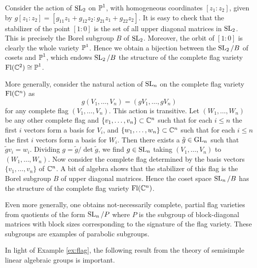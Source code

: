 \begin{example}
    \label{ex:flag}
    Consider the action of $\operatorname{SL}_2$ on $\operatorname{\mathbb{P}}^1$, with homogeneous coordinates $[z_1:z_2]$,
    given by $g[z_1:z_2]=[g_{11}z_1+g_{12}z_2:g_{21}z_1+g_{22}z_2]$. It is easy to check
    that the stabilizer of the point $[1:0]$ is the set of all upper diagonal matrices in
    $\operatorname{SL}_2$. This is precisely the Borel subgroup $B$ of $\operatorname{SL}_2$. Moreover, the orbit of $[1:0]$
    is clearly the whole variety $\operatorname{\mathbb{P}}^1$. Hence we obtain a bijection between the $\operatorname{SL}_2/B$ of
    cosets and $\operatorname{\mathbb{P}}^1$, which endows $\operatorname{SL}_2/B$ the structure of the complete flag variety
    $\operatorname{Fl}(\mathbb{C}^2)\cong\operatorname{\mathbb{P}}^1$.

    More generally, consider the natural action of $\operatorname{SL}_n$ on the complete flag variety
    $\operatorname{Fl}(\mathbb{C}^n)$ as
    \[g(V_1,\ldots, V_n) = (gV_1,\ldots, gV_n)\]
    for any complete flag $(V_1,\ldots,V_n)$. This action is transitive. Let $(W_1,\ldots,W_n)$ be
    any other complete flag and $\{v_1,\ldots,v_n\}\subset \mathbb{C}^n$ such that for each $i\leqslant n$
    the first $i$ vectors form a basis for $V_i$, and $\{w_1,\ldots,w_n\}\subset \mathbb{C}^n$ such that
    for each $i\leqslant n$ the first $i$ vectors form a basis for $W_i$. Then there exists
    a $\tilde g\in\operatorname{GL}_n$ such that $\tilde gv_i=w_i$. Dividing $g=\tilde g/\det \tilde g$,
    we find $g\in\operatorname{SL}_n$ taking $(V_1,\ldots,V_n)$ to $(W_1,\ldots,W_n)$. Now consider the
    complete flag determined by the basis vectors $\{v_1,\ldots,v_n\}$ of $\mathbb{C}^n$. A bit of algebra
    shows that the stabilizer of this flag is the Borel subgroup $B$ of upper diagonal
    matrices. Hence the coset space $\operatorname{SL}_n/B$ has the structure of the complete flag variety
    $\operatorname{Fl}(\mathbb{C}^n)$.
\end{example}

\begin{remark}
    Even more generally, one obtains not-necessarily complete, partial flag varieties
    from quotients of the form $\operatorname{SL}_n/P$ where $P$ is the subgroup of block-diagonal
    matrices with block sizes corresponding to the signature of the flag variety.
     These subgroups
    are examples of parabolic subgroups.
\end{remark}

In light of Example \ref{ex:flag}, the following result from the theory of
semisimple linear algebraic groups is important.

